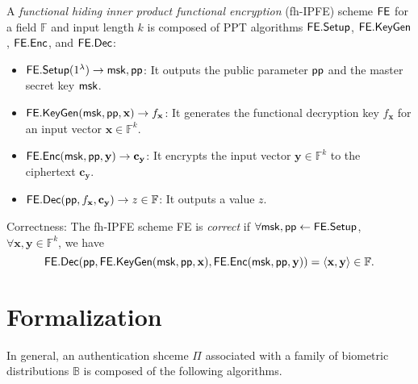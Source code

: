 \begin{definition}
\label{def:fh-IPFE}
	A \emph{functional hiding inner product functional encryption} (fh-IPFE) scheme $\sf FE$ for a field $\mathbb{F}$ and input length $k$ is composed of PPT algorithms ${\sf FE.Setup}$, ${\sf FE.KeyGen}$, ${\sf FE.Enc}$, and ${\sf FE.Dec}$:

\begin{itemize}

	\item ${\sf FE.Setup}(1^\lambda) \to {\sf msk}, {\sf pp}$: It outputs the public parameter ${\sf pp}$ and the master secret key ${\sf msk}$.

	\item ${\sf FE.KeyGen}({\sf msk}, {\sf pp}, \mathbf{x}) \to f_\mathbf{x}$: It generates the functional decryption key $f_\mathbf{x}$ for an input vector $\mathbf{x} \in \mathbb{F}^k$. 

	\item ${\sf FE.Enc}({\sf msk}, {\sf pp}, \mathbf{y}) \to \mathbf{c_y}$: It encrypts the input vector $\mathbf{y} \in \mathbb{F}^k$ to the ciphertext $\mathbf{c_y}$. 

	\item ${\sf FE.Dec}({\sf pp}, f_\mathbf{x}, \mathbf{c_y}) \to z \in \mathbb{F}$: It outputs a value $z$.

\end{itemize}

\noindent Correctness: The fh-IPFE scheme {\sf FE} is \emph{correct} if $\forall {\sf msk}, {\sf pp} \gets {\sf FE.Setup}$, $\forall \mathbf{x}, \mathbf{y} \in \mathbb{F}^k$, we have
	\[
		{\sf FE.Dec}( {\sf pp}, {\sf FE.KeyGen}({\sf msk}, {\sf pp}, \mathbf{x}), {\sf FE.Enc}({\sf msk}, {\sf pp}, \mathbf{y}) ) = \langle \mathbf{x} , \mathbf{y} \rangle \in \mathbb{F}.
	\]

\end{definition}


\section*{Formalization}
\label{sec:formalization}


In general, an authentication shceme $\Pi$ associated with a family of biometric distributions $\mathbb{B}$ is composed of the following algorithms.

